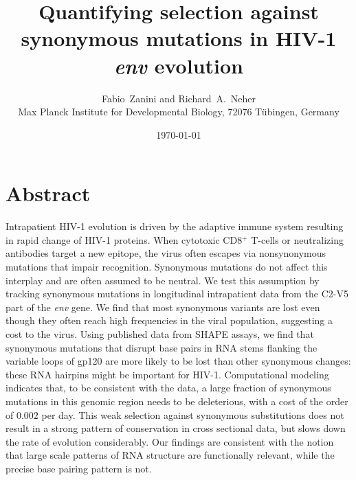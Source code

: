\documentclass[11pt]{article}
\newcommand{\env}{\textit{env}}
\newcommand{\shankaregion}{C2-V5}
\newcommand{\Author}{Fabio~Zanini and Richard~A.~Neher}
\newcommand{\Title}{Quantifying selection against synonymous mutations in HIV-1 \env{} evolution}
\newcommand{\Affiliation}{Max Planck Institute for Developmental Biology, 72076 T\"ubingen, Germany}
\begin{document}
\title{\Title}
\author{\Author\\ \Affiliation}
\date{\today}
\maketitle

\newpage
\section*{Abstract}
\noindent
Intrapatient HIV-1 evolution is driven by the adaptive immune system
resulting in rapid change of HIV-1 proteins. When cytotoxic CD8${}^+$
T-cells or neutralizing antibodies target a new epitope, the virus often
escapes via nonsynonymous mutations that impair recognition. Synonymous
mutations do not affect this interplay and are often assumed to be
neutral. We test this assumption by tracking synonymous mutations in
longitudinal intrapatient data from the \shankaregion{} part of the
\env{} gene. We find that most synonymous variants are lost even though
they often reach high frequencies in the viral population, suggesting a
cost to the virus. Using published data from SHAPE assays, we find that
synonymous mutations that disrupt base pairs in RNA stems flanking the
variable loops of gp120 are more likely to be lost than other synonymous
changes: these RNA hairpins might be important for HIV-1.  Computational
modeling indicates that, to be consistent with the data, a large fraction
of synonymous mutations in this genomic region needs to be deleterious,
with a cost of the order of $0.002$ per day. This weak selection against synonymous
substitutions does not result in a strong pattern of conservation in
cross sectional data, but slows down the rate of evolution
considerably. Our findings are consistent with the notion that large
scale patterns of RNA structure are functionally relevant, while the
precise base pairing pattern is not.
\end{document}
